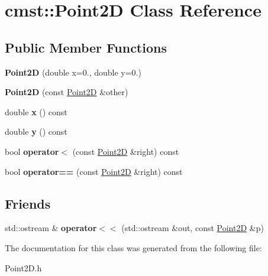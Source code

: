 \hypertarget{classcmst_1_1_point2_d}{}\section{cmst\+:\+:Point2D Class Reference}
\label{classcmst_1_1_point2_d}
\subsection*{Public Member Functions}
\begin{DoxyCompactItemize}
\item 
{\bfseries Point2D} (double x=0., double y=0.)\hypertarget{classcmst_1_1_point2_d_a2291fb012502a29399852810b5a081a8}{}\label{classcmst_1_1_point2_d_a2291fb012502a29399852810b5a081a8}

\item 
{\bfseries Point2D} (const \hyperlink{classcmst_1_1_point2_d}{Point2D} \&other)\hypertarget{classcmst_1_1_point2_d_a24e903416a709a44f844b93c7295ed67}{}\label{classcmst_1_1_point2_d_a24e903416a709a44f844b93c7295ed67}

\item 
double {\bfseries x} () const \hypertarget{classcmst_1_1_point2_d_a7745045ba529c4f2a2a0384974a42448}{}\label{classcmst_1_1_point2_d_a7745045ba529c4f2a2a0384974a42448}

\item 
double {\bfseries y} () const \hypertarget{classcmst_1_1_point2_d_a15a4383f1c181b7c7518ccac6f578564}{}\label{classcmst_1_1_point2_d_a15a4383f1c181b7c7518ccac6f578564}

\item 
bool {\bfseries operator$<$} (const \hyperlink{classcmst_1_1_point2_d}{Point2D} \&right) const \hypertarget{classcmst_1_1_point2_d_ada9efa4e0f4d7906e2ccaf2afeefea38}{}\label{classcmst_1_1_point2_d_ada9efa4e0f4d7906e2ccaf2afeefea38}

\item 
bool {\bfseries operator==} (const \hyperlink{classcmst_1_1_point2_d}{Point2D} \&right) const \hypertarget{classcmst_1_1_point2_d_a2181e34aa07d5ce5ac48545408924d22}{}\label{classcmst_1_1_point2_d_a2181e34aa07d5ce5ac48545408924d22}

\end{DoxyCompactItemize}
\subsection*{Friends}
\begin{DoxyCompactItemize}
\item 
std\+::ostream \& {\bfseries operator$<$$<$} (std\+::ostream \&out, const \hyperlink{classcmst_1_1_point2_d}{Point2D} \&p)\hypertarget{classcmst_1_1_point2_d_a538910ff384fb4f3f02d785a99e222cf}{}\label{classcmst_1_1_point2_d_a538910ff384fb4f3f02d785a99e222cf}

\end{DoxyCompactItemize}


The documentation for this class was generated from the following file\+:\begin{DoxyCompactItemize}
\item 
Point2\+D.\+h\end{DoxyCompactItemize}

